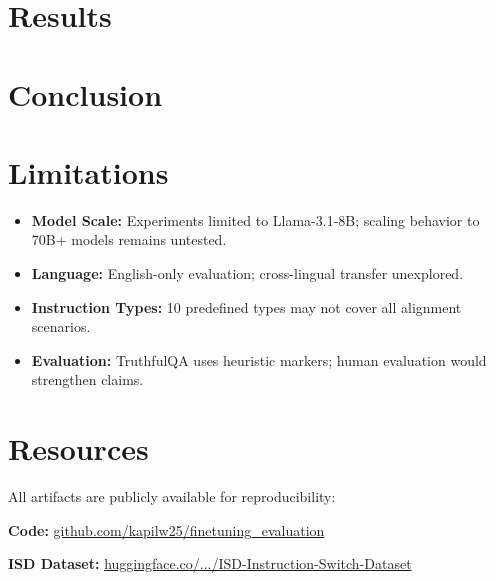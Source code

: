 \documentclass[11pt,twocolumn]{article}
\begin{document}
\section{Results}


\section{Conclusion}


\section*{Limitations}

\begin{itemize}
    \item \textbf{Model Scale:} Experiments limited to Llama-3.1-8B; scaling behavior to 70B+ models remains untested.
    \item \textbf{Language:} English-only evaluation; cross-lingual transfer unexplored.
    \item \textbf{Instruction Types:} 10 predefined types may not cover all alignment scenarios.
    \item \textbf{Evaluation:} TruthfulQA uses heuristic markers; human evaluation would strengthen claims.
\end{itemize}

\section*{Resources}

All artifacts are publicly available for reproducibility:

\smallskip
\noindent\textbf{Code:} \href{https://github.com/kapilw25/finetuning_evaluation}{github.com/kapilw25/finetuning\_evaluation}

\smallskip
\noindent\textbf{ISD Dataset:} \href{https://huggingface.co/datasets/kapilw25/ISD-Instruction-Switch-Dataset}{huggingface.co/.../ISD-Instruction-Switch-Dataset}
\end{document}
